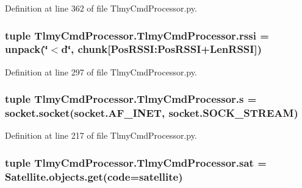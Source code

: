 Definition at line 362 of file Tlmy\+Cmd\+Processor.\+py.

\hypertarget{namespace_tlmy_cmd_processor_1_1_tlmy_cmd_processor_abcafa9e1e3e4760b2456be9871d9ff07}{}
\subsubsection[{rssi}]{\setlength{\rightskip}{0pt plus 5cm}tuple Tlmy\+Cmd\+Processor.\+Tlmy\+Cmd\+Processor.\+rssi = unpack(\char`\"{}$<$d\char`\"{}, chunk\mbox{[}Pos\+R\+S\+S\+I\+:\+Pos\+R\+S\+S\+I+{\bf Len\+R\+S\+S\+I}\mbox{]})}\label{namespace_tlmy_cmd_processor_1_1_tlmy_cmd_processor_abcafa9e1e3e4760b2456be9871d9ff07}


Definition at line 297 of file Tlmy\+Cmd\+Processor.\+py.

\hypertarget{namespace_tlmy_cmd_processor_1_1_tlmy_cmd_processor_a5b740cec8cab496e71b6896c16dfba9d}{}
\subsubsection[{s}]{\setlength{\rightskip}{0pt plus 5cm}tuple Tlmy\+Cmd\+Processor.\+Tlmy\+Cmd\+Processor.\+s = socket.\+socket(socket.\+A\+F\+\_\+\+I\+N\+E\+T, socket.\+S\+O\+C\+K\+\_\+\+S\+T\+R\+E\+A\+M)}\label{namespace_tlmy_cmd_processor_1_1_tlmy_cmd_processor_a5b740cec8cab496e71b6896c16dfba9d}


Definition at line 217 of file Tlmy\+Cmd\+Processor.\+py.

\hypertarget{namespace_tlmy_cmd_processor_1_1_tlmy_cmd_processor_a9a28f85a45c8480187e9bc9812c9eff5}{}
\subsubsection[{sat}]{\setlength{\rightskip}{0pt plus 5cm}tuple Tlmy\+Cmd\+Processor.\+Tlmy\+Cmd\+Processor.\+sat = Satellite.\+objects.\+get({\bf code}={\bf satellite})}\label{namespace_tlmy_cmd_processor_1_1_tlmy_cmd_processor_a9a28f85a45c8480187e9bc9812c9eff5}


